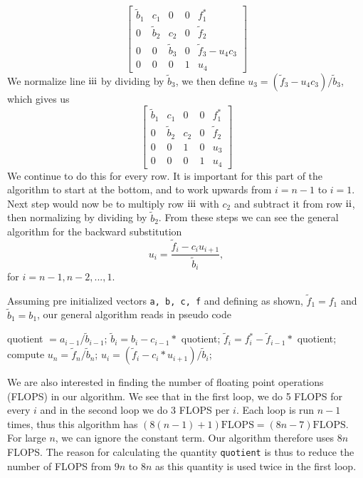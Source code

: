 \documentclass[%
 reprint,
nofootinbib,
 amsmath,amssymb,
 aps,
]{revtex4-1}
\newcommand{\RN}[1]{%
  \textup{\uppercase\expandafter{\romannumeral#1}}%
}
\begin{document}
\begin{equation}
  \begin{bmatrix}
    \tilde{b}_1 & c_1   & 0   & 0 &   f^{*}_1              \\
      0 & \tilde{b}_2 & c_2 & 0 &   \tilde{f}_2  \\
      0   & 0 & \tilde{b}_3 & 0 & \tilde{f}_3-u_4c_3\\
      0   & 0   & 0 & 1 & u_4
  \end{bmatrix} \label{gaussian_elimination12}
\end{equation}
We normalize line $\RN{3}$ by dividing by $\tilde{b}_3$, we then define $u_3 = (\tilde{f}_3-u_4c_3)/\tilde{b}_3$, which gives us
\begin{equation}
  \begin{bmatrix}
      \tilde{b}_1 & c_1   & 0   & 0 &   f^{*}_1              \\
      0 & \tilde{b}_2 & c_2 & 0 &   \tilde{f}_2  \\
      0   & 0 & 1 & 0 & u_3\\
      0   & 0   & 0 & 1 & u_4
  \end{bmatrix} \label{gaussian_elimination13}
\end{equation}
We continue to do this for every row. It is important for this part of the algorithm to start at the bottom, and to work upwards from $i = n-1$ to $i = 1$. Next step would now be to multiply row $\RN{3}$ with $c_2$ and subtract it from row $\RN{2}$, then normalizing by dividing by $\tilde{b}_2$. From these steps we can see the general algorithm for the backward substitution
\begin{equation}\label{eq: u}
  u_i = \frac{\tilde{f}_i-c_iu_{i+1}}{\tilde{b}_i},
\end{equation}
for $i = n-1 , n-2, ..., 1$.
\par
Assuming pre initialized vectors \texttt{a, b, c, f} and defining as shown, $\tilde{f}_1 = f_1$ and $\tilde{b}_1 = b_1$, our general algorithm reads in pseudo code
\begin{algorithmic}[H]
\State
{}
	\State quotient $= a_{i-1}/\tilde{b}_{i-1}$;
	\State $\tilde{b}_i = b_i - c_{i-1}*$ quotient;
	\State $\tilde{f}_i = f^*_i - \tilde{f}_{i-1}*$ quotient;
\EndFor
\State
\State compute $u_{n} = \tilde{f}_n/\tilde{b}_n$;
\State
{}
	\State $u_i = (\tilde{f}_i - c_i*u_{i+1})/\tilde{b}_i$;
\EndFor
\State
\end{algorithmic}
We are also interested in finding the number of floating point operations (FLOPS) in our algorithm. We see that in the first loop, we do 5 FLOPS for every $i$ and in the second loop we do 3 FLOPS per $i$. Each loop is run $n-1$ times, thus this algorithm has $(8(n-1) + 1) \mathrm{FLOPS} = (8n - 7) \mathrm{FLOPS}$. For large $n$, we can ignore the constant term. Our algorithm therefore uses $8n$ FLOPS. The reason for calculating the quantity \texttt{quotient} is thus to reduce the number of FLOPS from $9n$ to $8n$ as this quantity is used twice in the first loop.
\end{document}
